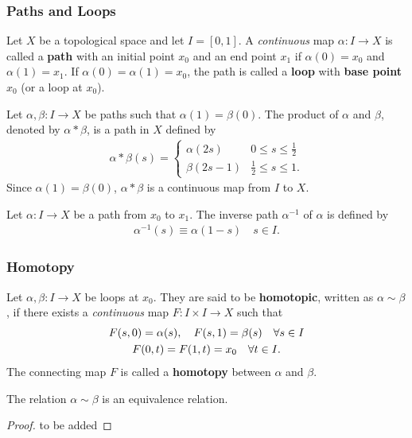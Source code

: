 \documentclass[10pt]{article}
\begin{document}
\subsubsection{Paths and Loops}
\begin{definition}[Path]
    Let $X$ be a topological space and let $I=[0,1]$.
    A \textit{continuous} map $\alpha:I\to X$ is called a \textbf{path} with an initial point $x_0$ and an end point $x_1$ if $\alpha(0)=x_0$ and $\alpha(1)=x_1$.
    If $\alpha(0)=\alpha(1)=x_0$, the path is called a \textbf{loop} with \textbf{base point} $x_0$ (or a loop at $x_0$).
\end{definition}

\begin{definition}
    Let $\alpha,\beta: I\to X$ be paths such that $\alpha(1)=\beta(0)$.
    The product of $\alpha$ and $\beta$, denoted by $\alpha*\beta$, is a path in $X$ defined by
    \begin{align}
        \alpha*\beta(s)=\begin{cases}
            \alpha(2s)  & 0\leq s\leq\frac{1}{2}  \\
            \beta(2s-1) & \frac{1}{2}\leq s\leq1.
        \end{cases}
    \end{align}
    Since $\alpha(1)=\beta(0)$, $\alpha*\beta$ is a continuous map from $I$ to $X$.
\end{definition}
\begin{definition}
    Let $\alpha:I\to X$ be a path from $x_0$ to $x_1$.
    The inverse path $\alpha^{-1}$ of $\alpha$ is defined by
    \begin{align}
        \alpha^{-1}(s)\equiv\alpha(1-s)\quad s\in I.
    \end{align}
\end{definition}

\subsubsection{Homotopy}
\begin{definition}[Homotopy]
    Let $\alpha,\beta:I\to X$ be loops at $x_0$.
    They are said to be \textbf{homotopic}, written as $\alpha\sim\beta$, if there exists a \textit{continuous} map $F:I\times I\to X$ such that
    \begin{gather}
        F(s,0)=\alpha(s),\quad F(s,1)=\beta(s)\quad \forall s\in I\notag\\
        F(0,t)=F(1,t)=x_0\quad\forall t\in I.\notag
    \end{gather}
    The connecting map $F$ is called a \textbf{homotopy} between $\alpha$ and $\beta$.
\end{definition}
\begin{proposition}
    The relation $\alpha\sim\beta$ is an equivalence relation.
\end{proposition}
\begin{proof}
    to be added
\end{proof}
\end{document}
